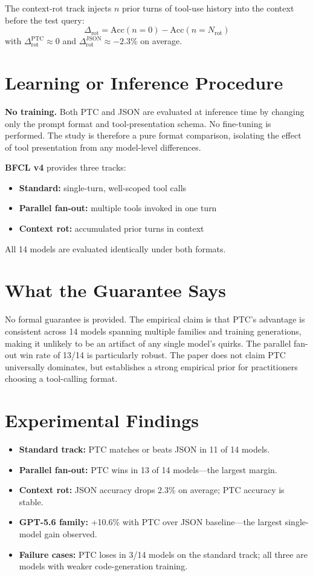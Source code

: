 \documentclass[10pt,twocolumn]{article}
\begin{document}
The context-rot track injects $n$ prior turns of tool-use history into the context
before the test query:
\[
\Delta_{\mathrm{rot}} = \mathrm{Acc}(n=0) - \mathrm{Acc}(n=N_{\mathrm{rot}})
\]
with $\Delta_{\mathrm{rot}}^{\mathrm{PTC}} \approx 0$ and
$\Delta_{\mathrm{rot}}^{\mathrm{JSON}} \approx -2.3\%$ on average.

\section{Learning or Inference Procedure}

\textbf{No training.} Both PTC and JSON are evaluated at inference time by changing
only the prompt format and tool-presentation schema. No fine-tuning is performed.
The study is therefore a pure format comparison, isolating the effect of tool
presentation from any model-level differences.

\textbf{BFCL v4} provides three tracks:
\begin{itemize}[itemsep=2pt,parsep=0pt]
  \item \textbf{Standard:} single-turn, well-scoped tool calls
  \item \textbf{Parallel fan-out:} multiple tools invoked in one turn
  \item \textbf{Context rot:} accumulated prior turns in context
\end{itemize}

All 14 models are evaluated identically under both formats.

\section{What the Guarantee Says}

No formal guarantee is provided. The empirical claim is that PTC's advantage is
consistent across 14 models spanning multiple families and training generations,
making it unlikely to be an artifact of any single model's quirks. The parallel
fan-out win rate of 13/14 is particularly robust. The paper does not claim PTC
universally dominates, but establishes a strong empirical prior for practitioners
choosing a tool-calling format.

\section{Experimental Findings}

\begin{itemize}[itemsep=2pt,parsep=0pt]
  \item \textbf{Standard track:} PTC matches or beats JSON in 11 of 14 models.
  \item \textbf{Parallel fan-out:} PTC wins in 13 of 14 models---the largest margin.
  \item \textbf{Context rot:} JSON accuracy drops 2.3\% on average;
    PTC accuracy is stable.
  \item \textbf{GPT-5.6 family:} +10.6\% with PTC over JSON baseline---the largest
    single-model gain observed.
  \item \textbf{Failure cases:} PTC loses in 3/14 models on the standard track;
    all three are models with weaker code-generation training.
\end{itemize}
\end{document}
